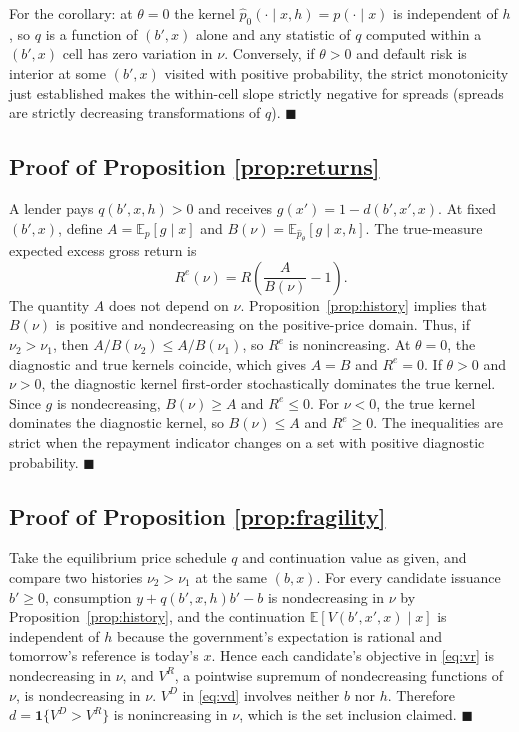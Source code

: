 \documentclass[11pt]{article}
\theoremstyle{definition}
\newcommand{\E}{\mathbb{E}}
\newcommand{\one}{\mathbf{1}}
\begin{document}
For the corollary: at $\theta = 0$ the kernel $\hat p_0(\cdot \mid x, h) = p(\cdot \mid x)$ is independent of $h$, so $q$ is a function of $(b', x)$ alone and any statistic of $q$ computed within a $(b', x)$ cell has zero variation in $\nu$. Conversely, if $\theta > 0$ and default risk is interior at some $(b', x)$ visited with positive probability, the strict monotonicity just established makes the within-cell slope strictly negative for spreads (spreads are strictly decreasing transformations of $q$). $\blacksquare$

\subsection{Proof of Proposition \ref{prop:returns}}
A lender pays $q(b',x,h)>0$ and receives $g(x')=1-d(b',x',x)$. At fixed $(b',x)$, define $A=\E_p[g\mid x]$ and $B(\nu)=\E_{\hat p_\theta}[g\mid x,h]$. The true-measure expected excess gross return is
\[
R^e(\nu)=R\left(\frac{A}{B(\nu)}-1\right).
\]
The quantity $A$ does not depend on $\nu$. Proposition~\ref{prop:history} implies that $B(\nu)$ is positive and nondecreasing on the positive-price domain. Thus, if $\nu_2>\nu_1$, then $A/B(\nu_2)\leq A/B(\nu_1)$, so $R^e$ is nonincreasing. At $\theta=0$, the diagnostic and true kernels coincide, which gives $A=B$ and $R^e=0$. If $\theta>0$ and $\nu>0$, the diagnostic kernel first-order stochastically dominates the true kernel. Since $g$ is nondecreasing, $B(\nu)\geq A$ and $R^e\leq0$. For $\nu<0$, the true kernel dominates the diagnostic kernel, so $B(\nu)\leq A$ and $R^e\geq0$. The inequalities are strict when the repayment indicator changes on a set with positive diagnostic probability. $\blacksquare$

\subsection{Proof of Proposition \ref{prop:fragility}}
Take the equilibrium price schedule $q$ and continuation value as given, and compare two histories $\nu_2 > \nu_1$ at the same $(b, x)$. For every candidate issuance $b' \geq 0$, consumption $y + q(b', x, h)b' - b$ is nondecreasing in $\nu$ by Proposition~\ref{prop:history}, and the continuation $\E[V(b', x', x) \mid x]$ is independent of $h$ because the government's expectation is rational and tomorrow's reference is today's $x$. Hence each candidate's objective in \eqref{eq:vr} is nondecreasing in $\nu$, and $V^R$, a pointwise supremum of nondecreasing functions of $\nu$, is nondecreasing in $\nu$. $V^D$ in \eqref{eq:vd} involves neither $b$ nor $h$. Therefore $d = \one\{V^D > V^R\}$ is nonincreasing in $\nu$, which is the set inclusion claimed. $\blacksquare$
\end{document}
